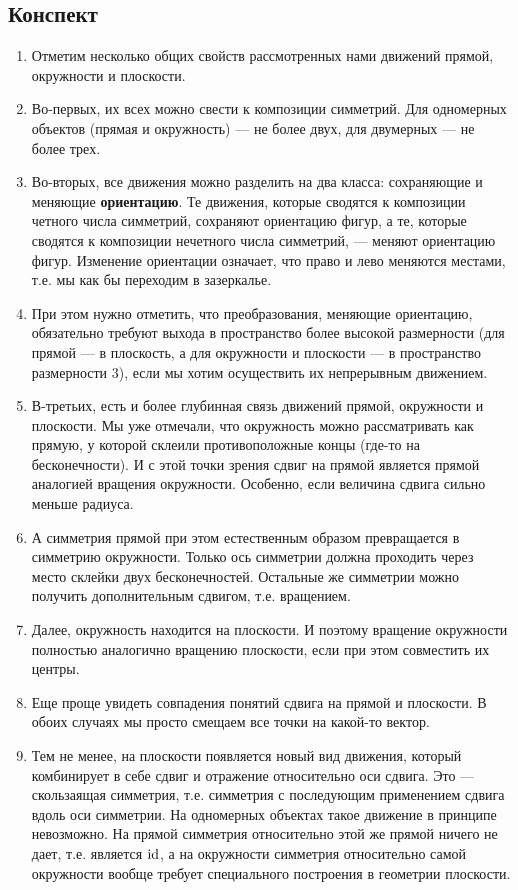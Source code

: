 \subsection*{Конспект}
\begin{enumerate}
\item Отметим несколько общих свойств рассмотренных нами движений прямой, окружности и плоскости.
\item Во-первых, их всех можно свести к композиции симметрий. Для одномерных объектов (прямая и окружность) --- не более двух, для двумерных --- не более трех.
\item Во-вторых, все движения можно разделить на два класса: сохраняющие и меняющие \textbf{ориентацию}. Те движения, которые сводятся к композиции четного числа симметрий, сохраняют ориентацию фигур, а те, которые сводятся к композиции нечетного числа симметрий, --- меняют ориентацию фигур. Изменение ориентации означает, что право и лево меняются местами, т.е. мы как бы переходим в зазеркалье. 
\item При этом нужно отметить, что преобразования, меняющие ориентацию, обязательно требуют выхода в пространство более высокой размерности (для прямой --- в плоскость, а для окружности и плоскости --- в пространство размерности 3), если мы хотим осуществить их непрерывным движением.
\item В-третьих, есть и более глубинная связь движений прямой, окружности и плоскости. Мы уже отмечали, что окружность можно рассматривать как прямую, у которой склеили противоположные концы (где-то на бесконечности). И с этой точки зрения сдвиг на прямой является прямой аналогией вращения окружности. Особенно, если величина сдвига сильно меньше радиуса.
\item А симметрия прямой при этом естественным образом превращается в симметрию окружности. Только ось симметрии должна проходить через место склейки двух бесконечностей. Остальные же симметрии можно получить дополнительным сдвигом, т.е. вращением.
\item Далее, окружность находится на плоскости. И поэтому вращение окружности полностью аналогично вращению плоскости, если при этом совместить их центры.
\item Еще проще увидеть совпадения понятий сдвига на прямой и плоскости. В обоих случаях мы просто смещаем все точки на какой-то вектор.
\item Тем не менее, на плоскости появляется новый вид движения, который комбинирует в себе сдвиг и отражение относительно оси сдвига. Это --- скользаящая симметрия, т.е. симметрия с последующим применением сдвига вдоль оси симметрии. На одномерных объектах такое движение в принципе невозможно. На прямой симметрия относительно этой же прямой ничего не дает, т.е. является $\mathrm{id}$, а на окружности симметрия относительно самой окружности вообще требует специального построения в геометрии плоскости.
\end{enumerate}



